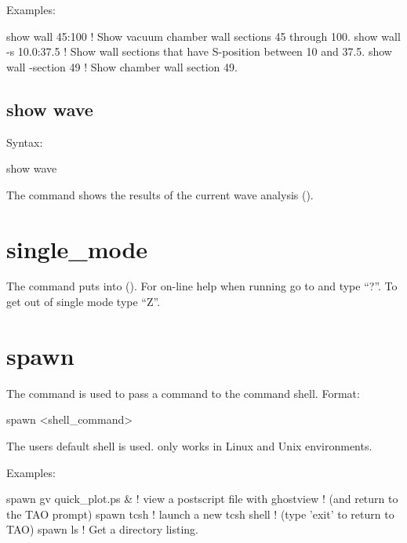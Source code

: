 {{{{{{{{{Examples:
\begin{example}
  show wall 45:100       ! Show vacuum chamber wall sections 45 through 100.
  show wall -s 10.0:37.5 ! Show wall sections that have S-position between 10 and 37.5.
  show wall -section 49  ! Show chamber wall section 49.
\end{example}


\subsection{show wave}
\label{s:show.wave}

Syntax:
\begin{example}
  show wave
\end{example}

The  command shows the results of the current wave analysis ().


\section{single_mode}
\label{s:sing}

The  command puts \tao into  ().
For on-line help when running \tao go to  and type ``?''.
To get out of single mode type ``Z''.

\section{spawn}
\label{s:spawn}

The  command is used to pass a command to the command shell. Format:
\begin{example}
  spawn <shell_command>
\end{example}

The users default shell is used.  only works in Linux and Unix environments.

Examples:
\begin{example}
  spawn gv quick_plot.ps &      ! view a postscript file with ghostview
                                ! (and return to the TAO prompt)
  spawn tcsh                    ! launch a new tcsh shell 
                                ! (type 'exit' to return to TAO)
  spawn ls                      ! Get a directory listing.
\end{example}

}}}}}}}}}
